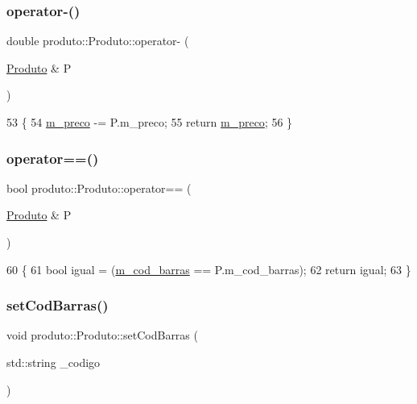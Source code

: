 \subsubsection{\texorpdfstring{operator-\/()}{operator-()}}
{\footnotesize\ttfamily double produto\+::\+Produto\+::operator-\/ (\begin{DoxyParamCaption}\item[{\hyperlink{classproduto_1_1Produto}{Produto} \&}]{P }\end{DoxyParamCaption})}


\begin{DoxyCode}
53     \{
54         \hyperlink{classproduto_1_1Produto_aaa3f0f133345202eafcb2fa72248e05d}{m\_preco} -= P.m\_preco;
55         \textcolor{keywordflow}{return} \hyperlink{classproduto_1_1Produto_aaa3f0f133345202eafcb2fa72248e05d}{m\_preco};
56     \}
\end{DoxyCode}
\mbox{\label{classproduto_1_1Produto_af2cb621ae73fbd2369dec3070b2c5ac3}} 
\subsubsection{\texorpdfstring{operator==()}{operator==()}}
{\footnotesize\ttfamily bool produto\+::\+Produto\+::operator== (\begin{DoxyParamCaption}\item[{\hyperlink{classproduto_1_1Produto}{Produto} \&}]{P }\end{DoxyParamCaption})}


\begin{DoxyCode}
60     \{
61         \textcolor{keywordtype}{bool} igual = (\hyperlink{classproduto_1_1Produto_af441e885b23e4b6782be22c0be25ba72}{m\_cod\_barras} == P.m\_cod\_barras);
62         \textcolor{keywordflow}{return} igual;
63     \}
\end{DoxyCode}
\mbox{\label{classproduto_1_1Produto_a23abca118c602f8e004800ae0c3764f0}} 
\subsubsection{\texorpdfstring{set\+Cod\+Barras()}{setCodBarras()}}
{\footnotesize\ttfamily void produto\+::\+Produto\+::set\+Cod\+Barras (\begin{DoxyParamCaption}\item[{std\+::string}]{\+\_\+codigo }\end{DoxyParamCaption})}



